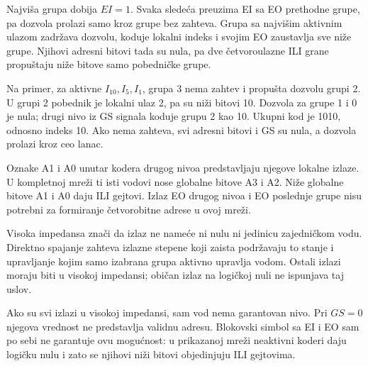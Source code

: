 
Najviša grupa dobija \(EI=1\). Svaka sledeća preuzima EI sa EO prethodne grupe, pa dozvola prolazi samo kroz grupe bez zahteva. Grupa sa najvišim aktivnim ulazom zadržava dozvolu, koduje lokalni indeks i svojim EO zaustavlja sve niže grupe. Njihovi adresni bitovi tada su nula, pa dve četvoroulazne ILI grane propuštaju niže bitove samo pobedničke grupe.

Na primer, za aktivne \(I_{10},I_5,I_1\), grupa 3 nema zahtev i propušta dozvolu grupi 2. U grupi 2 pobednik je lokalni ulaz 2, pa su niži bitovi 10. Dozvola za grupe 1 i 0 je nula; drugi nivo iz GS signala koduje grupu 2 kao 10. Ukupni kod je 1010, odnosno indeks 10. Ako nema zahteva, svi adresni bitovi i GS su nula, a dozvola prolazi kroz ceo lanac.

Oznake A1 i A0 unutar kodera drugog nivoa predstavljaju njegove lokalne izlaze. U kompletnoj mreži ti isti vodovi nose globalne bitove A3 i A2. Niže globalne bitove A1 i A0 daju ILI gejtovi. Izlaz EO drugog nivoa i EO poslednje grupe nisu potrebni za formiranje četvorobitne adrese u ovoj mreži.

Visoka impedansa znači da izlaz ne nameće ni nulu ni jedinicu zajedničkom vodu. Direktno spajanje zahteva izlazne stepene koji zaista podržavaju to stanje i upravljanje kojim samo izabrana grupa aktivno upravlja vodom. Ostali izlazi moraju biti u visokoj impedansi; običan izlaz na logičkoj nuli ne ispunjava taj uslov.

Ako su svi izlazi u visokoj impedansi, sam vod nema garantovan nivo. Pri \(GS=0\) njegova vrednost ne predstavlja validnu adresu. Blokovski simbol sa EI i EO sam po sebi ne garantuje ovu mogućnost: u prikazanoj mreži neaktivni koderi daju logičku nulu i zato se njihovi niži bitovi objedinjuju ILI gejtovima.
